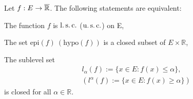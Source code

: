    \begin{theorem}
        Let $f: E \to \overline{\mathbb{R}}$. The following statements are equivalent:
        \begin{asparaenum}[a)]
            \item
                The function $f$ is $\operatorname{l.s.c.}$ ($\operatorname{u.s.c.}$) on E,
            \item
                The set $\text{epi}(f) \ (\text{hypo}(f))$ is a closed subset of 
                $ E \times \mathbb{R}$,
            \item
                The sublevel set 
                \begin{align*}
                    & l_{\alpha}(f) := \{ x \in E : f(x) \leq \alpha \}, \\
                    & (l^{\alpha}(f) := \{ x \in E : f(x) \geq \alpha \})
                \end{align*}
                is closed for all $\alpha \in \mathbb{R}$.
        \end{asparaenum}
    \end{theorem}
